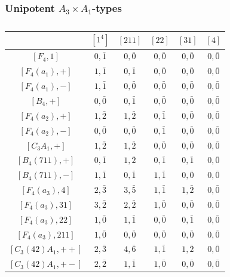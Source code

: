     \subsubsection*{Unipotent \texorpdfstring{$A_3\times A_1$}{PDFstring}-types}    
    \begin{table}[ht]
        \centering
        \caption{} \label{tbl:F4_K2_1}
        \begin{tabular}{|c|ccccc|}
            \hline
            & $[1^4]$ & $[211]$ & $[22]$ & $[31]$ & $[4]$ \\\hline
            $[F_4,1]$ & $0,\bar1$ & $0,\bar0$ & $0,\bar0$ & $0,\bar0$ & $0,\bar0$ \\\hline
            $[F_4(a_1),+]$ & $1,\bar1$ & $0,\bar1$ & $0,\bar0$ & $0,\bar0$ & $0,\bar0$ \\
            $[F_4(a_1),-]$ & $1,\bar1$ & $0,\bar0$ & $0,\bar0$ & $0,\bar0$ & $0,\bar0$ \\
            $[B_4,+]$ & $0,\bar0$ & $0,\bar1$ & $0,\bar0$ & $0,\bar0$ & $0,\bar0$ \\\hline
            $[F_4(a_2),+]$ & $1,\bar2$ & $1,\bar2$ & $0,\bar1$ & $0,\bar0$ & $0,\bar0$ \\
            $[F_4(a_2),-]$ & $0,\bar0$ & $0,\bar0$ & $0,\bar1$ & $0,\bar0$ & $0,\bar0$ \\
            $[C_3A_1,+]$ & $1,\bar2$ & $1,\bar2$ & $0,\bar0$ & $0,\bar0$ & $0,\bar0$ \\\hline
            $[B_4(711),+]$ & $0,\bar1$ & $1,\bar2$ & $0,\bar1$ & $0,\bar1$ & $0,\bar0$ \\
            $[B_4(711),-]$ & $1,\bar1$ & $0,\bar1$ & $1,\bar1$ & $0,\bar0$ & $0,\bar0$ \\\hline
            $[F_4(a_3),4]$ & $2,\bar{3}$ & $3,\bar{5}$ & $1,\bar1$ & $1,\bar2$ & $0,\bar0$ \\
            $[F_4(a_3),31]$ & $3,\bar2$ & $2,\bar2$ & $1,\bar0$ & $0,\bar0$ & $0,\bar0$ \\
            $[F_4(a_3),22]$ & $1,\bar0$ & $1,\bar1$ & $0,\bar0$ & $0,\bar1$ & $0,\bar0$ \\
            $[F_4(a_3),211]$ & $1,\bar0$ & $0,\bar0$ & $0,\bar0$ & $0,\bar0$ & $0,\bar0$ \\
            $[C_3(42)A_1,++]$ & $2,\bar{3}$ & $4,\bar{6}$ & $1,\bar1$ & $1,\bar2$ & $0,\bar0$ \\
            $[C_3(42)A_1,+-]$ & $2,\bar2$ & $1,\bar1$ & $1,\bar0$ & $0,\bar0$ & $0,\bar0$ \\

\end{tabular}
\end{table}
